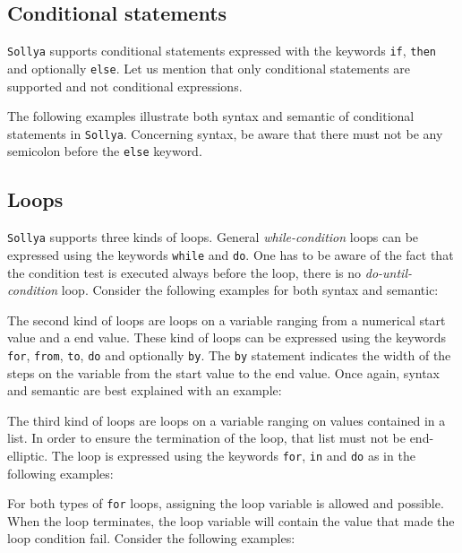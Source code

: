 \documentclass[a4paper]{article}
\newcommand{\key}[1]{\texttt{#1}}
\newcommand{\sollya}{\texttt{Sollya}\xspace}
\begin{document}
\subsection{Conditional statements}

\sollya supports conditional statements expressed with the keywords
\key{if}, \key{then} and optionally \key{else}. Let us mention that only
conditional statements are supported and not conditional expressions. 

The following examples illustrate both syntax and semantic of
conditional statements in \sollya. Concerning syntax, be aware that there must not be any semicolon
before the \key{else} keyword.



\subsection{Loops}

\sollya supports three kinds of loops. General \emph{while-condition}
loops can be expressed using the keywords \key{while} and
\key{do}. One has to be aware of the fact that the condition test is
executed always before the loop, there is no \emph{do-until-condition}
loop. Consider the following examples for both syntax and semantic:



The second kind of loops are loops on a variable ranging from a
numerical start value and a end value. These kind of loops can be
expressed using the keywords \key{for}, \key{from}, \key{to}, \key{do}
and optionally \key{by}. The \key{by} statement indicates the width of
the steps on the variable from the start value to the end value. Once
again, syntax and semantic are best explained with an example:



The third kind of loops are loops on a variable ranging on values
contained in a list. In order to ensure the termination of the loop,
that list must not be end-elliptic. The loop is expressed using the
keywords \key{for}, \key{in} and \key{do} as in the following
examples:



For both types of \key{for} loops, assigning the loop variable is
allowed and possible. When the loop terminates, the loop variable will
contain the value that made the loop condition fail. Consider the
following examples:
\end{document}
